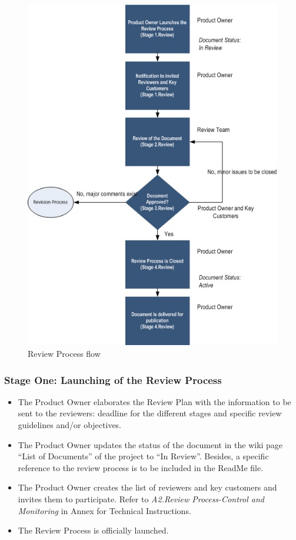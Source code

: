 \documentclass{template/openetcs_article}
\begin{document}
\begin{figure}[H]
\centering
\includegraphics{./figures/Review_Process.JPG}
\caption{Review Process flow}
\end{figure}


\subsubsection{Stage One: Launching of the Review Process}

\begin{itemize}
\item The Product Owner elaborates the Review Plan with the information to be sent to the reviewers: deadline for the different stages and specific review guidelines and/or objectives.
\item The Product Owner updates the status of the document in the wiki page “List of Documents” of the project to “In Review”. Besides, a specific reference to the review process is to be included in the ReadMe file.
\item The Product Owner creates the list of reviewers and key customers and invites them to participate. Refer to {\it A2.Review Process-Control and Monitoring} in Annex for Technical Instructions.
\item The Review Process is officially launched.
\end{itemize}
\end{document}
